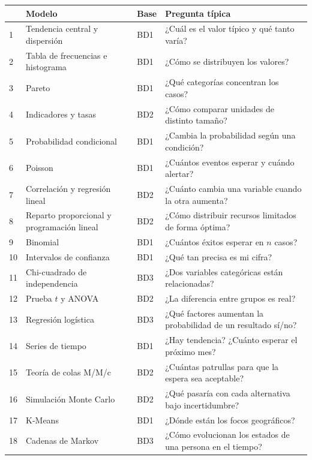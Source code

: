 \begin{center}
\footnotesize
\begin{tabularx}{\textwidth}{@{}p{0.5cm}p{4.4cm}p{1.2cm}X@{}}
\toprule
& \textbf{Modelo} & \textbf{Base} & \textbf{Pregunta típica}\\
\midrule
1 & Tendencia central y dispersión & BD1 & ¿Cuál es el valor típico y qué tanto varía?\\
2 & Tabla de frecuencias e histograma & BD1 & ¿Cómo se distribuyen los valores?\\
3 & Pareto & BD1 & ¿Qué categorías concentran los casos?\\
4 & Indicadores y tasas & BD2 & ¿Cómo comparar unidades de distinto tamaño?\\
5 & Probabilidad condicional & BD1 & ¿Cambia la probabilidad según una condición?\\
6 & Poisson & BD1 & ¿Cuántos eventos esperar y cuándo alertar?\\
7 & Correlación y regresión lineal & BD2 & ¿Cuánto cambia una variable cuando la otra aumenta?\\
8 & Reparto proporcional y programación lineal & BD2 & ¿Cómo distribuir recursos limitados de forma óptima?\\
9 & Binomial & BD1 & ¿Cuántos éxitos esperar en $n$ casos?\\
10 & Intervalos de confianza & BD1 & ¿Qué tan precisa es mi cifra?\\
11 & Chi-cuadrado de independencia & BD3 & ¿Dos variables categóricas están relacionadas?\\
12 & Prueba $t$ y ANOVA & BD2 & ¿La diferencia entre grupos es real?\\
13 & Regresión logística & BD3 & ¿Qué factores aumentan la probabilidad de un resultado sí/no?\\
14 & Series de tiempo & BD1 & ¿Hay tendencia? ¿Cuánto esperar el próximo mes?\\
15 & Teoría de colas M/M/c & BD2 & ¿Cuántas patrullas para que la espera sea aceptable?\\
16 & Simulación Monte Carlo & BD2 & ¿Qué pasaría con cada alternativa bajo incertidumbre?\\
17 & K-Means & BD1 & ¿Dónde están los focos geográficos?\\
18 & Cadenas de Markov & BD3 & ¿Cómo evolucionan los estados de una persona en el tiempo?\\
\bottomrule
\end{tabularx}
\end{center}

